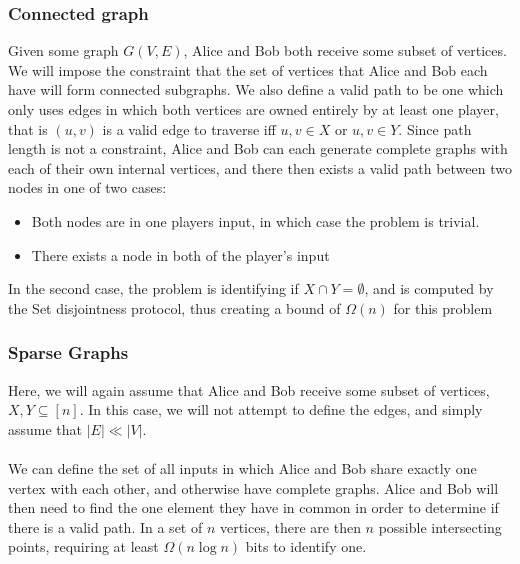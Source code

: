 \subsubsection*{Connected graph}
Given some graph $G (V,E)$, Alice and Bob both receive some subset of vertices.
We will impose the constraint that the set of vertices that Alice and Bob each
have will form connected subgraphs. We also define a valid path to be one which
only uses edges in which both vertices are owned entirely by at least one
player, that is $(u,v)$ is a valid edge to traverse iff $u, v \in X$ or $u, v
\in Y$. Since path length is not a constraint, Alice and Bob can each generate
complete graphs with each of their own internal vertices, and there then exists
a valid path between two nodes in one of two cases:
\begin{itemize}
	\item[Case 1] Both nodes are in one players input, in which case the
		problem is trivial.
	\item[Case 2] There exists a node in both of the player's input
\end{itemize}
In the second case, the problem is identifying if $X \cap Y = \emptyset$, and is
computed by the Set disjointness protocol, thus creating a bound of $\Omega(n)$
for this problem
\subsubsection{Sparse Graphs}
Here, we will again assume that Alice and Bob receive some subset of vertices,
$X, Y \subseteq [n]$. In this case, we will not attempt to define the edges,
and simply assume that $|E| \ll |V|$.
\\\\
We can define the set of all inputs in which Alice and Bob share exactly one
vertex with each other, and otherwise have complete graphs. Alice and Bob will
then need to find the one element they have in common in order to determine if
there is a valid path. In a set of $n$ vertices, there are then $n$ possible
intersecting points, requiring at least $\Omega(n \log n)$ bits to identify one.
